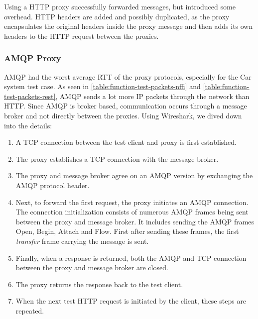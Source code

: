 Using a HTTP proxy successfully forwarded messages, but introduced some
overhead. HTTP headers are added and possibly duplicated, as the proxy
encapsulates the original headers inside the proxy message and then adds
its own headers to the HTTP request between the proxies.


\subsubsection{AMQP Proxy}

AMQP had the worst average RTT of the proxy protocols, especially for the Car
system test case. As seen in \cref{table:function-test-packets-nffi} and
\cref{table:function-test-packets-rest}, AMQP sends a lot more IP packets
through the network than HTTP. Since AMQP is broker based, communication occurs
through a message broker and not directly between the proxies. Using Wireshark,
we dived down into the details:

\begin{enumerate}

	\item A TCP connection between the test client and  proxy is first established.

    \item The proxy establishes a TCP connection with the message broker.

    \item The proxy and message broker agree on an AMQP version by exchanging
    the AMQP protocol header.

	 \item Next, to forward the first request, the proxy initiates an AMQP
	 connection. The connection initialization consists of numerous AMQP frames
	 being sent between the proxy and message broker. It includes sending the
	 AMQP frames Open, Begin, Attach and Flow.  First after sending these frames,
	 the first \textit{transfer} frame carrying the message is sent.

     \item Finally, when a response is returned, both the AMQP and TCP connection
     between the proxy and message broker are closed.

     \item The proxy returns the response back to the test client.

     \item When the next test HTTP request is initiated by the client, these
     steps are repeated.

\end{enumerate}

